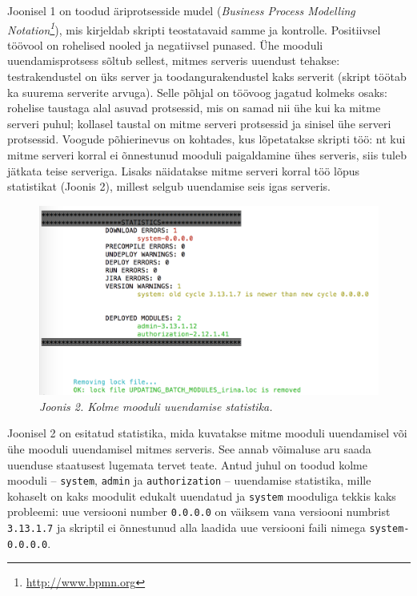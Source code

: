 \documentclass[12pt]{article}
\newcommand{\code}[1]{\texttt{#1}}
\begin{document}
   Joonisel 1 on toodud äriprotsesside mudel (\textit{Business Process Modelling Notation\footnote{\url{http://www.bpmn.org}}}), mis kirjeldab skripti teostatavaid samme ja kontrolle. Positiivsel töövool on rohelised nooled ja negatiivsel punased. Ühe mooduli uuendamisprotsess sõltub sellest, mitmes serveris uuendust tehakse: testrakendustel on üks server ja toodangurakendustel kaks serverit (skript töötab ka suurema serverite arvuga). Selle põhjal on töövoog jagatud kolmeks osaks: rohelise taustaga alal asuvad protsessid, mis on samad nii ühe kui ka mitme serveri puhul; kollasel taustal on mitme serveri protsessid ja sinisel ühe serveri protsessid. Voogude põhierinevus on kohtades, kus lõpetatakse skripti töö: nt kui mitme serveri korral ei õnnestunud mooduli paigaldamine ühes serveris, siis tuleb jätkata teise serveriga. Lisaks näidatakse mitme serveri korral töö lõpus statistikat (Joonis 2), millest selgub uuendamise seis igas serveris.
   
   \begin{figure}[H]
     \begin{center}
       \includegraphics[width=\textwidth]{screenshots/statistics.png}
       \caption*{\textit{Joonis 2. Kolme mooduli uuendamise statistika.}}
     \end{center}
   \end{figure}
   
   Joonisel 2 on esitatud statistika, mida kuvatakse mitme mooduli uuendamisel või ühe mooduli uuendamisel mitmes serveris. See annab võimaluse aru saada uuenduse staatusest lugemata tervet teate. Antud juhul on toodud kolme mooduli \--- \code{system}, \code{admin} ja \code{authorization} \--- uuendamise statistika, mille kohaselt on  kaks moodulit edukalt uuendatud ja \code{system} mooduliga tekkis kaks probleemi: uue versiooni number \code{0.0.0.0} on väiksem vana versiooni numbrist \code{3.13.1.7} ja skriptil ei õnnestunud alla laadida uue versiooni faili nimega \code{system-0.0.0.0}. 
   
\end{document}
